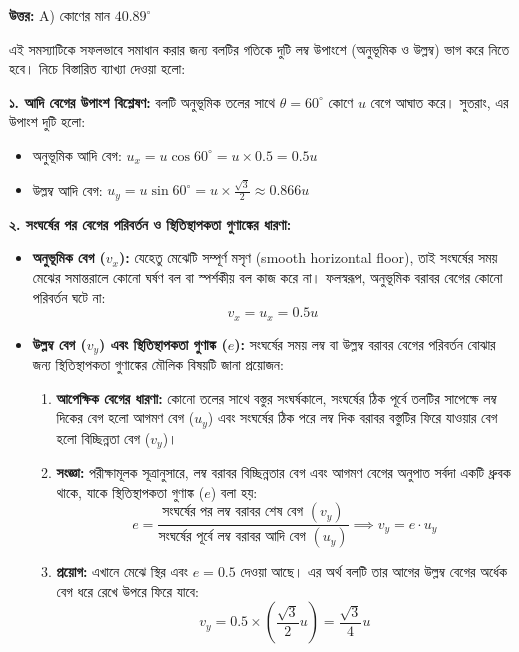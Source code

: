 \documentclass[12pt, a4paper]{article}
\begin{document}
\vspace{0.5em}
\begin{tcolorbox}[answerbox]
\textbf{\color{success} উত্তর:} A) কোণের মান $40.89^\circ$
\end{tcolorbox}
\vspace{1em}

\begin{tcolorbox}[solutionbox={সমাধান (Solution)}]
\noindent
এই সমস্যাটিকে সফলভাবে সমাধান করার জন্য বলটির গতিকে দুটি লম্ব উপাংশে (অনুভূমিক ও উল্লম্ব) ভাগ করে নিতে হবে। নিচে বিস্তারিত ব্যাখ্যা দেওয়া হলো:

\vspace{0.5em}
\textbf{১. আদি বেগের উপাংশ বিশ্লেষণ:}
বলটি অনুভূমিক তলের সাথে $\theta = 60^\circ$ কোণে $u$ বেগে আঘাত করে। সুতরাং, এর উপাংশ দুটি হলো:
\begin{itemize}[leftmargin=1.5em, itemsep=0.2em]
    \item অনুভূমিক আদি বেগ: $u_x = u \cos 60^\circ = u \times 0.5 = 0.5u$
    \item উল্লম্ব আদি বেগ: $u_y = u \sin 60^\circ = u \times \frac{\sqrt{3}}{2} \approx 0.866u$
\end{itemize}

\vspace{0.5em}
\textbf{২. সংঘর্ষের পর বেগের পরিবর্তন ও স্থিতিস্থাপকতা গুণাঙ্কের ধারণা:}
\begin{itemize}[leftmargin=1.5em, itemsep=0.4em]
    \item \textbf{অনুভূমিক বেগ ($v_x$):} যেহেতু মেঝেটি সম্পূর্ণ মসৃণ (smooth horizontal floor), তাই সংঘর্ষের সময় মেঝের সমান্তরালে কোনো ঘর্ষণ বল বা স্পর্শকীয় বল কাজ করে না। ফলস্বরূপ, অনুভূমিক বরাবর বেগের কোনো পরিবর্তন ঘটে না:
    $$v_x = u_x = 0.5u$$
    \item \textbf{উল্লম্ব বেগ ($v_y$) এবং স্থিতিস্থাপকতা গুণাঙ্ক ($e$):} 
    সংঘর্ষের সময় লম্ব বা উল্লম্ব বরাবর বেগের পরিবর্তন বোঝার জন্য স্থিতিস্থাপকতা গুণাঙ্কের মৌলিক বিষয়টি জানা প্রয়োজন:
    \begin{enumerate}[label=(\alph*), leftmargin=1.5em, itemsep=0.2em]
        \item \textbf{আপেক্ষিক বেগের ধারণা:} কোনো তলের সাথে বস্তুর সংঘর্ষকালে, সংঘর্ষের ঠিক পূর্বে তলটির সাপেক্ষে লম্ব দিকের বেগ হলো আগমণ বেগ ($u_y$) এবং সংঘর্ষের ঠিক পরে লম্ব দিক বরাবর বস্তুটির ফিরে যাওয়ার বেগ হলো বিচ্ছিন্নতা বেগ ($v_y$)।
        \item \textbf{সংজ্ঞা:} পরীক্ষামূলক সূত্রানুসারে, লম্ব বরাবর বিচ্ছিন্নতার বেগ এবং আগমণ বেগের অনুপাত সর্বদা একটি ধ্রুবক থাকে, যাকে স্থিতিস্থাপকতা গুণাঙ্ক ($e$) বলা হয়:
        $$e = \frac{\text{সংঘর্ষের পর লম্ব বরাবর শেষ বেগ } (v_y)}{\text{সংঘর্ষের পূর্বে লম্ব বরাবর আদি বেগ } (u_y)} \implies v_y = e \cdot u_y$$
        \item \textbf{প্রয়োগ:} এখানে মেঝে স্থির এবং $e = 0.5$ দেওয়া আছে। এর অর্থ বলটি তার আগের উল্লম্ব বেগের অর্ধেক বেগ ধরে রেখে উপরে ফিরে যাবে:
        $$v_y = 0.5 \times \left(\frac{\sqrt{3}}{2} u\right) = \frac{\sqrt{3}}{4} u$$
    \end{enumerate}
\end{itemize}


\end{tcolorbox}
\end{document}
